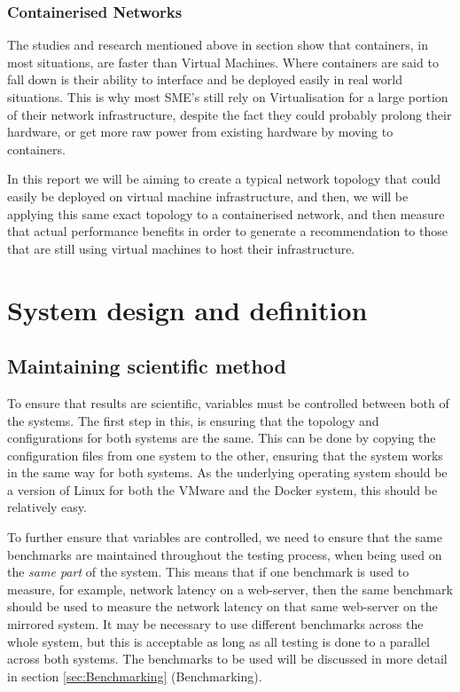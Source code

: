 \subsection{Containerised Networks}
The studies and research mentioned above in section \label{ComparisonStudies} show that containers, in most situations, are faster than Virtual Machines. Where containers are said to fall down is their ability to interface and be deployed easily in real world situations. This is why most SME's still rely on Virtualisation for a large portion of their network infrastructure, despite the fact they could probably prolong their hardware, or get more raw power from existing hardware by moving to containers.

In this report we will be aiming to create a typical network topology that could easily be deployed on virtual machine infrastructure, and then, we will be applying this same exact topology to a containerised network, and then measure that actual performance benefits in order to generate a recommendation to those that are still using virtual machines to host their infrastructure.

\chapter{System design and definition}
\label{SystemDesignDefinition}

\section{Maintaining scientific method}
To ensure that results are scientific, variables must be controlled between both of the systems. The first step in this, is ensuring that the topology and configurations for both systems are the same. This can be done by copying the configuration files from one system to the other, ensuring that the system works in the same way for both systems. As the underlying operating system should be a version of Linux for both the VMware and the Docker system, this should be relatively easy.

To further ensure that variables are controlled, we need to ensure that the same benchmarks are maintained throughout the testing process, when being used on the \emph{same part} of the system. This means that if one benchmark is used to measure, for example, network latency on a web-server, then the same benchmark should be used to measure the network latency on that same web-server on the mirrored system. It may be necessary to use different benchmarks across the whole system, but this is acceptable as long as all testing is done to a parallel across both systems. The benchmarks to be used will be discussed in more detail in section \ref{sec:Benchmarking} (Benchmarking).


